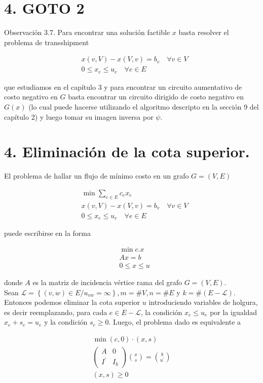 \documentclass[10pt]{article}
\begin{document}
\section*{4. GOTO 2}
Observación 3.7. Para encontrar una solución factible $x$ basta resolver el problema de transshipment

$$
\begin{aligned}
& x(v, V)-x(V, v)=b_{v} \quad \forall v \in V \\
& 0 \leq x_{e} \leq u_{e} \quad \forall e \in E
\end{aligned}
$$

que estudiamos en el capítulo 3 y para encontrar un circuito aumentativo de costo negativo en $G$ basta encontrar un circuito dirigido de costo negativo en $G(x)$ (lo cual puede hacerse utilizando el algoritmo descripto en la sección 9 del capítulo 2) y luego tomar su imagen inversa por $\psi$.

\section*{4. Eliminación de la cota superior.}
El problema de hallar un flujo de mínimo costo en un grafo $G=(V, E)$

$$
\begin{aligned}
& \min \sum_{e \in E} c_{e} x_{e} \\
& x(v, V)-x(V, v)=b_{v} \quad \forall v \in V \\
& 0 \leq x_{e} \leq u_{e} \quad \forall e \in E
\end{aligned}
$$

puede escribirse en la forma

$$
\begin{aligned}
& \min c . x \\
& A x=b \\
& 0 \leq x \leq u
\end{aligned}
$$

donde $A$ es la matriz de incidencia vértice rama del grafo $G=(V, E)$.\\
Sean $\mathcal{L}=\left\{(v, w) \in E / u_{v w}=\infty\right\}, m=\# V, n=\# E$ y $k=\#(E-\mathcal{L})$. Entonces podemos eliminar la cota superior $u$ introduciendo variables de holgura, es decir reemplazando, para cada $e \in E-\mathcal{L}$, la condición $x_{e} \leq u_{e}$ por la igualdad $x_{e}+s_{e}=u_{e}$ y la condición $s_{e} \geq 0$. Luego, el problema dado es equivalente a

$$
\begin{gathered}
\min (c, 0) \cdot(x, s) \\
\left(\begin{array}{cc}
A & 0 \\
I^{\prime} & I_{k}
\end{array}\right)\binom{x}{s}=\binom{b}{u^{\prime}} \\
(x, s) \geq 0
\end{gathered}
$$
\end{document}
